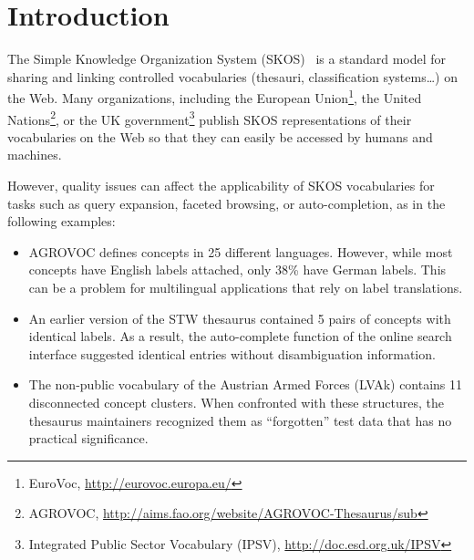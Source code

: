 
\section{Introduction}\label{sec:introduction}


The Simple Knowledge Organization System (SKOS)~\cite{SkosReference2008} is a standard model for sharing and linking controlled vocabularies (thesauri, classification systems\ldots) on the Web. Many organizations, including the European Union\footnote{EuroVoc, \url{http://eurovoc.europa.eu/}}, the United Nations\footnote{AGROVOC, \url{http://aims.fao.org/website/AGROVOC-Thesaurus/sub}}, or the UK government\footnote{Integrated Public Sector Vocabulary (IPSV), \url{http://doc.esd.org.uk/IPSV}} publish SKOS representations of their vocabularies on the Web so that they can easily be accessed by humans and machines.

However, quality issues can affect the applicability of SKOS vocabularies for tasks such as query expansion, faceted browsing, or auto-completion, as in the following examples: 

\begin{itemize}

	\item AGROVOC defines concepts in 25 different languages. However, while most concepts have English labels attached, only 38\% have German labels. This can be a problem for multilingual applications that rely on label translations.

	\item An earlier version of the STW thesaurus contained 5 pairs of concepts with identical labels. As a result, the auto-complete function of the online search interface suggested identical entries without disambiguation information.


	\item The non-public vocabulary of the Austrian Armed Forces (LVAk) contains 11 disconnected concept clusters. When confronted with these structures, the thesaurus maintainers recognized them as ``forgotten'' test data that has no practical significance.
	

\end{itemize}

